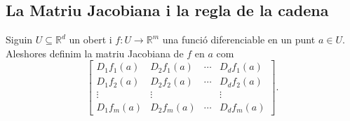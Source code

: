 \documentclass[../Apunts.tex]{subfiles}
\begin{document}
	\subsection{La Matriu Jacobiana i la regla de la cadena}
	\begin{definition}
		\label{def:Jacobiana}
		Siguin \(U\subseteq\mathbb{R}^{d}\) un obert i \(f\colon U\to\mathbb{R}^{m}\) una funció diferenciable en un punt \(a\in U\). Aleshores definim la matriu Jacobiana de \(f\) en \(a\) com
		\[\left[\begin{matrix}
		D_{1}f_{1}(a) & D_{2}f_{1}(a) & \cdots & D_{d}f_{1}(a)\\
		D_{1}f_{2}(a) & D_{2}f_{2}(a) & \cdots & D_{d}f_{2}(a)\\
		\vdots & \vdots && \vdots \\
		D_{1}f_{m}(a) & D_{2}f_{m}(a) & \cdots & D_{d}f_{m}(a)
		\end{matrix}\right].\]
	\end{definition}
\end{document}
